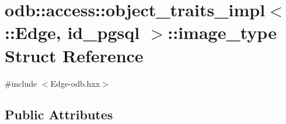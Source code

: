 \hypertarget{structodb_1_1access_1_1object__traits__impl_3_01_1_1_edge_00_01id__pgsql_01_4_1_1image__type}{}\section{odb\+:\+:access\+:\+:object\+\_\+traits\+\_\+impl$<$ \+:\+:Edge, id\+\_\+pgsql $>$\+:\+:image\+\_\+type Struct Reference}
\label{structodb_1_1access_1_1object__traits__impl_3_01_1_1_edge_00_01id__pgsql_01_4_1_1image__type}


{\ttfamily \#include $<$Edge-\/odb.\+hxx$>$}

\subsection*{Public Attributes}
